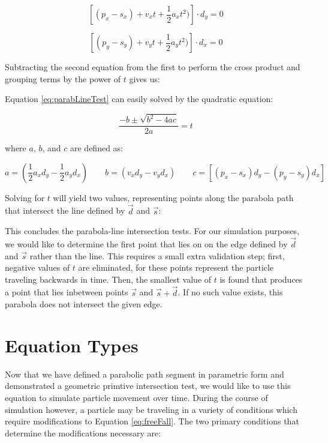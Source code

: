 $$
\left [ (p_x - s_x) + v_x  t + \frac{1}{2} a_x  t^2) \right ] \cdot  d_y = 0
$$

\vspace{0.1in}

$$
\left [ (p_y - s_y) + v_y t + \frac{1}{2} a_y t^2) \right ] \cdot d_x = 0
$$

Subtracting the second equation from the first to perform the cross product and grouping terms by the power of $t$ gives us:


 {
	\label{eq:parabLineTest}
}

Equation \eqref{eq:parabLineTest} can easily solved by the quadratic equation:

$$
	\frac{-b \pm \sqrt{b^2 - 4ac}}{2a} = t
$$

where $a$, $b$, and $c$ are defined as:

$$
a = (\frac{1}{2} a_x d_y - \frac{1}{2} a_y d_x) \qquad b = (v_x d_y - v_y d_x) \qquad c = \left [ (p_x - s_x) d_y - (p_y - s_y) d_x \right ]
$$

Solving for $t$ will yield two values, representing points along the parabola path that intersect the line defined by $\vec{d}$ and $\vec{s}$:


This concludes the parabola-line intersection tests. For our simulation purposes, we would like to determine the first point that lies on on the edge defined by $\vec{d}$ and $\vec{s}$ rather than the line. This requires a small extra validation step; first, negative values of $t$ are eliminated, for these points represent the particle traveling backwards in time. Then, the smallest value of $t$ is found that produces a point that lies inbetween points $\vec{s}$ and $\vec{s} + \vec{d}$. If no such value exists, this parabola does not intersect the given edge.

\section{Equation Types}

Now that we have defined a parabolic path segment in parametric form and demonstrated a geometric primtive intersection test, we would like to use this equation to simulate particle movement over time. During the course of simulation however, a particle may be traveling in a variety of conditions which require modifications to Equation \eqref{eq:freeFall}. The two primary conditions that determine the modifications necessary are:

